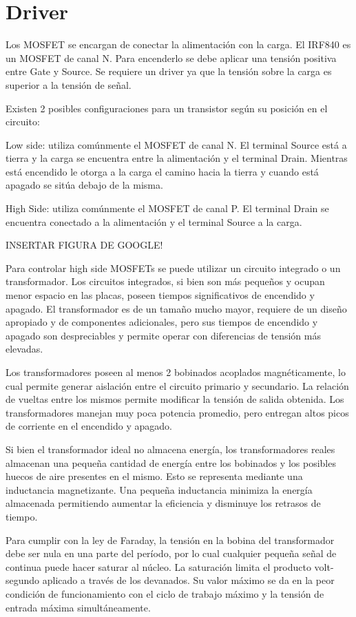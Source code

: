 \section{Driver}

Los MOSFET se encargan de conectar la alimentación con la carga. El IRF840 es un MOSFET de canal N. 
Para encenderlo se debe aplicar una tensión positiva entre Gate y Source. 
Se requiere un driver ya que la tensión sobre la carga es superior a la tensión de señal. 

Existen 2 posibles configuraciones para un transistor según su posición en el circuito:

Low side: utiliza comúnmente el MOSFET de canal N. 
El terminal Source está a tierra y la carga se encuentra entre la alimentación y el terminal Drain. 
Mientras está encendido le otorga a la carga el camino hacia la tierra y cuando está apagado se sitúa debajo de la misma. 

High Side: utiliza comúnmente el MOSFET de canal P. 
El terminal Drain se encuentra conectado a la alimentación y el terminal Source a la carga. 

INSERTAR FIGURA DE GOOGLE!

Para controlar high side MOSFETs se puede utilizar un circuito integrado o un transformador. 
Los circuitos integrados, si bien son más pequeños y ocupan menor espacio en las placas, 
poseen tiempos significativos de encendido y apagado. 
El transformador es de un tamaño mucho mayor, requiere de un diseño apropiado y de componentes adicionales,
 pero sus tiempos de encendido y apagado son despreciables y permite operar con diferencias de tensión más elevadas.

Los transformadores poseen al menos 2 bobinados acoplados magnéticamente, 
lo cual permite generar aislación entre el circuito primario y secundario. 
La relación de vueltas entre los mismos permite modificar la tensión de salida obtenida. 
Los transformadores manejan muy poca potencia promedio, pero entregan altos picos de corriente en el encendido y apagado.

Si bien el transformador ideal no almacena energía, los transformadores reales 
almacenan una pequeña cantidad de energía entre los bobinados y los posibles huecos de aire presentes en el mismo. 
Esto se representa mediante una inductancia magnetizante. 
Una pequeña inductancia minimiza la energía almacenada permitiendo aumentar la eficiencia y disminuye los retrasos de tiempo. 

Para cumplir con la ley de Faraday, la tensión en la bobina del transformador debe ser nula en una parte del período, 
por lo cual cualquier pequeña señal de continua puede hacer saturar al núcleo. 
La saturación limita el producto volt-segundo aplicado a través de los devanados. 
Su valor máximo se da en la peor condición de funcionamiento con el ciclo de trabajo máximo y la tensión de entrada máxima simultáneamente. 


